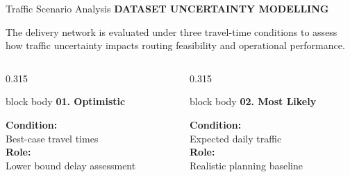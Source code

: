 \documentclass[aspectratio=169,10pt]{beamer}
\newcommand{\sectiontag}[1]{%
    {\scriptsize\bfseries\color{Accent}\MakeUppercase{#1}}\par\vspace{0.08cm}
}
\begin{document}
\begin{frame}{Traffic Scenario Analysis}
\sectiontag{Dataset Uncertainty Modelling}

\vspace{-0.15cm}

\begin{center}
    \footnotesize\color{Dark}
    The delivery network is evaluated under three travel-time conditions to assess how traffic uncertainty impacts routing feasibility and operational performance.
\end{center}

\vspace{0.15cm}

\begin{columns}[T,totalwidth=\textwidth]

\begin{column}{0.315\textwidth}
    \begin{beamercolorbox}[rounded=true,shadow=false,wd=\linewidth,sep=4pt]{block body}
        {\bfseries\color{Primary}\scriptsize 01. Optimistic}\par\vspace{0.04cm}
        \scriptsize
        \textbf{Condition:}\\
        {\footnotesize Best-case travel times}\\[0.08cm]
        \textbf{Role:}\\
        {\footnotesize Lower bound delay assessment}
    \end{beamercolorbox}
\end{column}

\begin{column}{0.315\textwidth}
    \begin{beamercolorbox}[rounded=true,shadow=false,wd=\linewidth,sep=4pt]{block body}
        {\bfseries\color{Accent}\scriptsize 02. Most Likely}\par\vspace{0.04cm}
        \scriptsize
        \textbf{Condition:}\\
        {\footnotesize Expected daily traffic}\\[0.08cm]
        \textbf{Role:}\\
        {\footnotesize Realistic planning baseline}
    \end{beamercolorbox}
\end{column}


\end{columns}
\end{frame}
\end{document}
